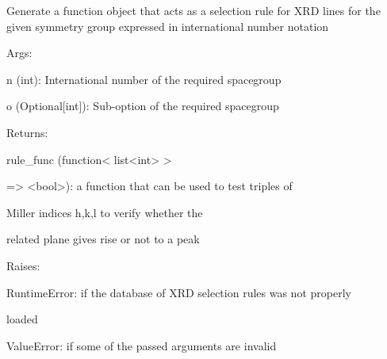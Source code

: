\documentclass[letterpaper,10pt,english]{sphinxmanual}
\begin{document}
\begin{fulllineitems}
\label{doctree/soprano.calculate.xrd.sel_rules:soprano.calculate.xrd.sel_rules.get_sel_rule_from_international}
Generate a function object that acts as a selection rule for XRD lines
for the given symmetry group expressed in international number notation

\begin{DUlineblock}{0em}
\item[] Args:
\item[]
\begin{DUlineblock}{\DUlineblockindent}
\item[] n (int): International number of the required spacegroup
\item[] o (Optional{[}int{]}): Sub-option of the required spacegroup
\end{DUlineblock}
\end{DUlineblock}

\begin{DUlineblock}{0em}
\item[] Returns:
\item[]
\begin{DUlineblock}{\DUlineblockindent}
\item[] rule\_func (function\textless{} list\textless{}int\textgreater{} \textgreater{}
\item[]
\begin{DUlineblock}{\DUlineblockindent}
\item[] =\textgreater{} \textless{}bool\textgreater{}): a function that can be used to test triples of
\item[]
\begin{DUlineblock}{\DUlineblockindent}
\item[] Miller indices h,k,l to verify whether the
\item[] related plane gives rise or not to a peak
\end{DUlineblock}
\end{DUlineblock}
\end{DUlineblock}
\end{DUlineblock}

\begin{DUlineblock}{0em}
\item[] Raises:
\item[]
\begin{DUlineblock}{\DUlineblockindent}
\item[] RuntimeError: if the database of XRD selection rules was not properly
\item[]
\begin{DUlineblock}{\DUlineblockindent}
\item[] loaded
\end{DUlineblock}
\item[] ValueError: if some of the passed arguments are invalid
\end{DUlineblock}
\end{DUlineblock}

\end{fulllineitems}
\end{document}
